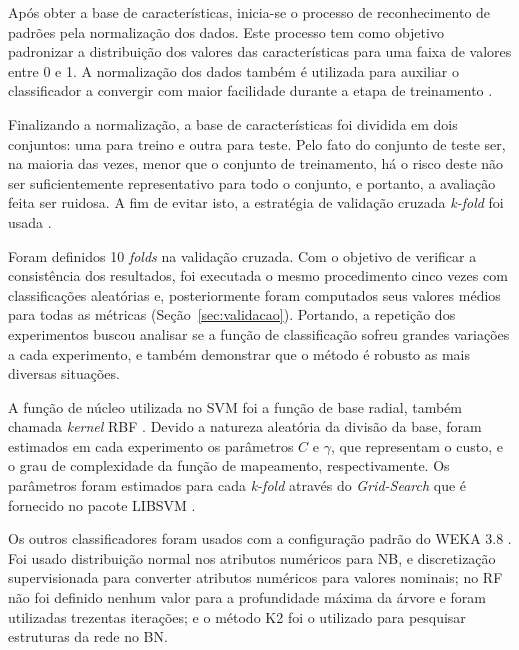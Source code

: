 Após obter a base de características, inicia-se o processo de reconhecimento de padrões pela normalização dos dados. Este processo tem como objetivo padronizar a distribuição dos valores das características para uma faixa de valores entre 0 e 1. A normalização dos dados também é utilizada para auxiliar o classificador a convergir com maior facilidade durante a etapa de treinamento \cite{duda1973pattern}.

Finalizando a normalização, a base de características foi dividida em dois conjuntos: uma para treino e outra para teste. Pelo fato do conjunto de teste ser, na maioria das vezes, menor que o conjunto de treinamento, há o risco deste não ser suficientemente representativo para todo o conjunto, e portanto, a avaliação feita ser ruidosa. A fim de evitar isto, a estratégia de validação cruzada \textit{k-fold} foi usada \cite{rodriguez2010sensitivity}. 


Foram definidos 10 \textit{folds} na validação cruzada. Com o objetivo de verificar a consistência dos resultados, foi executada o mesmo procedimento cinco vezes com classificações aleatórias e, posteriormente foram computados seus valores médios para todas as métricas (Seção~\ref{sec:validacao}). Portando, a repetição dos experimentos buscou analisar se a função de classificação sofreu grandes variações a cada experimento, e também demonstrar que o método é robusto as mais diversas situações.

A função de núcleo utilizada no SVM foi a função de base radial, também chamada \textit{kernel} RBF \cite{scholkopf2002learning}. Devido a natureza aleatória da divisão da base, foram estimados em cada experimento os parâmetros $C$ e $\gamma$, que representam o custo, e o grau de complexidade da função de mapeamento, respectivamente. Os parâmetros foram estimados para cada \textit{k-fold} através do \textit{Grid-Search} que é fornecido no pacote LIBSVM \cite{chang2011libsvm}.

Os outros classificadores foram usados com a configuração padrão do WEKA 3.8 \cite{hall2009weka}. Foi usado distribuição normal nos atributos numéricos para NB, e discretização supervisionada para converter atributos numéricos para valores nominais; no RF não foi definido nenhum valor para a profundidade máxima da árvore e foram utilizadas trezentas iterações; e o método K2 \cite{cooper1992bayesian} foi o utilizado para pesquisar estruturas da rede no BN.

